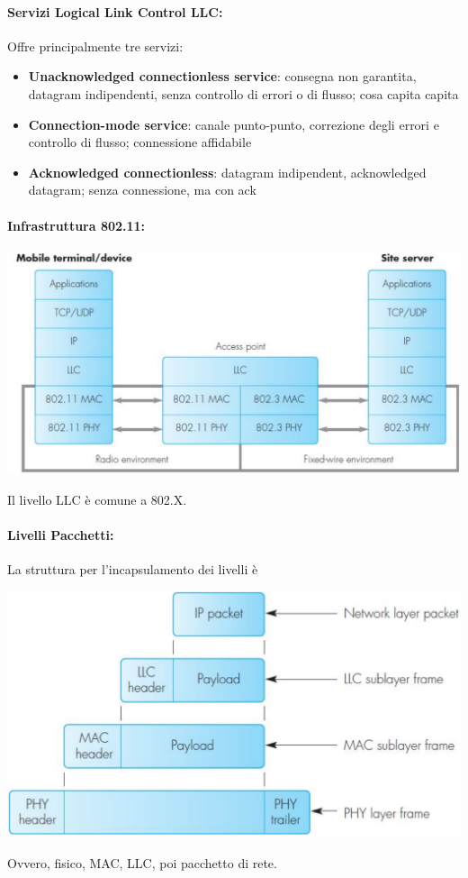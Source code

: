 \paragraph{Servizi Logical Link Control LLC:} Offre principalmente tre servizi: 
\begin{itemize}
	\item \textbf{Unacknowledged connectionless service}: consegna non garantita, datagram indipendenti, senza controllo di errori o di flusso; cosa capita capita
	\item \textbf{Connection-mode service}: canale punto-punto, correzione degli errori e controllo di flusso; connessione affidabile
	\item \textbf{Acknowledged connectionless}: datagram indipendent, acknowledged datagram; senza connessione, ma con ack
\end{itemize}

\paragraph{Infrastruttura 802.11:} 
\begin{center}
	\includegraphics[width=0.85\linewidth]{img/wlan/infr}
\end{center}
Il livello LLC è comune a 802.X.  \\

\paragraph{Livelli Pacchetti:} La struttura per l'incapsulamento dei livelli è 
\begin{center}
	\includegraphics[width=0.6\linewidth]{img/wlan/pacch1}
\end{center}
Ovvero, fisico, MAC, LLC, poi pacchetto di rete.

